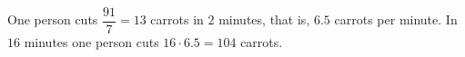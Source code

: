 One person cuts $\dfrac{91}{7}=13$ carrots in $2$ minutes, that is, $6.5$ carrots per minute. In $16$ minutes one person cuts $16\cdot6.5=\boxed{104}$ carrots.
